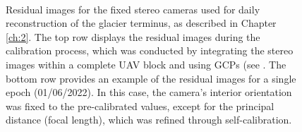 \begin{figure}[hb]
{  } \\ \vspace{2mm}
  \caption[]{Residual images for the fixed stereo cameras used for daily reconstruction of the glacier terminus, as described in Chapter \ref{ch:2}. The top row displays the residual images during the calibration process, which was conducted by integrating the stereo images within a complete UAV block and using GCPs (see . The bottom row provides an example of the residual images for a single epoch (01/06/2022). In this case, the camera's interior orientation was fixed to the pre-calibrated values, except for the principal distance (focal length), which was refined through self-calibration.}
  \label{fig:app:camera_residuals_stereocams}
\end{figure}

